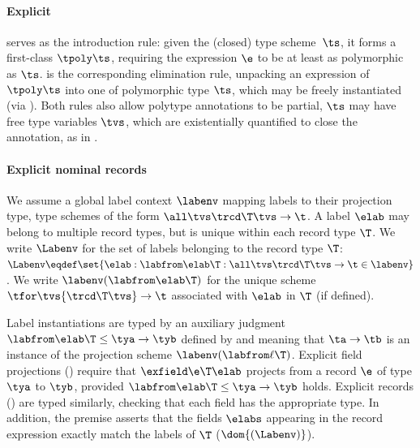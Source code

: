 \documentclass[acmsmall,screen,nonacm%
\Anonymous{,anonymous}{}%
\Final{}{,review}%
]{acmart}
\providecommand{\DIFdel}[1]{\protect\cbdelete{\protect\color{red}#1}\protect\cbdelete} %
\providecommand{\DIFaddbegin}{} %
\providecommand{\DIFaddend}{} %
\providecommand{\DIFdelbegin}{} %
\providecommand{\DIFdelend}{} %
\begin{document}
\paragraph {Explicit \DIFdelbegin \DIFdel{polytypes}\DIFdelend \DIFaddbegin \polytypes\DIFaddend }

 serves as the introduction rule: given the (closed) type
scheme~$\ts$, it forms a first-class \DIFdelbegin \DIFdel{polytype }\DIFdelend \DIFaddbegin \polytype \DIFaddend $\tpoly \ts$, requiring the
expression
$\e$ to be at least as polymorphic as $\ts$.  is the
corresponding
elimination rule, unpacking an expression of \DIFdelbegin \DIFdel{polytype }\DIFdelend \DIFaddbegin \polytype \DIFaddend $\tpoly \ts$ into
one of polymorphic type $\ts$,
which may be freely instantiated (via ). Both rules also allow
polytype annotations to be partial, \ie $\ts$ may have free type variables
$\tvs$, which are existentially quantified to close the annotation, as in
.


\paragraph{Explicit nominal records}
\label {app/typing/X/records}



We assume a global label context $\labenv$ mapping labels to their projection
type, \ie type schemes of the form $\all \tvs \trcd \T \tvs \to \t$. A label
$\elab$ may belong to multiple record types, but is unique within each record
type $\T$. We write $\Labenv$ for the set of labels belonging to the record type $\T$:
%
${\Labenv} \eqdef \set {\elab : \labfrom \elab \T : \all \tvs \trcd \T \tvs \to \t \in \labenv}$.
%
We write $\labenv (\labfrom \elab \T)$ for the unique scheme
$\tfor \tvs {\trcd \T \tvs} \to \t$ associated with $\elab$ in $\T$ (if defined).


Label instantiations are typed by an auxiliary judgment ${\labfrom \elab \T}
\leq \tya \to \tyb$ defined by  and
meaning that $\ta \to \tb$ is an instance of the projection scheme
$\labenv (\labfrom \ell \T)$. Explicit field projections
() require that $\exfield \e \T \elab$ projects from a record
$\e$ of type $\tya$ to $\tyb$, provided ${\labfrom \elab \T}
\leq \tya \to \tyb$ holds.
%
Explicit records () are typed similarly, checking that each field
has the appropriate type. In addition, the premise asserts that the fields
$\elabs$ appearing in the record expression exactly match the labels of $\T$
(\ie $\dom {(\Labenv)}$).
\end{document}
